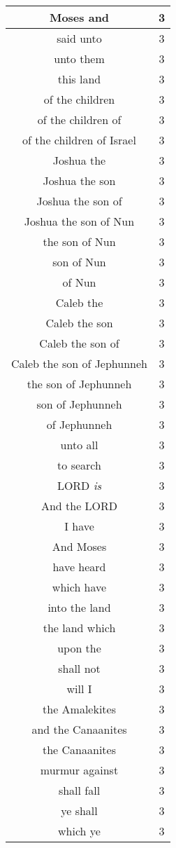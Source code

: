 \begin{center}
\begin{longtable}{|c|c|}
Moses and & 3\\ \hline 
said unto & 3\\ \hline 
unto them & 3\\ \hline 
this land & 3\\ \hline 
of the children & 3\\ \hline 
of the children of & 3\\ \hline 
of the children of Israel & 3\\ \hline 
Joshua the & 3\\ \hline 
Joshua the son & 3\\ \hline 
Joshua the son of & 3\\ \hline 
Joshua the son of Nun & 3\\ \hline 
the son of Nun & 3\\ \hline 
son of Nun & 3\\ \hline 
of Nun & 3\\ \hline 
Caleb the & 3\\ \hline 
Caleb the son & 3\\ \hline 
Caleb the son of & 3\\ \hline 
Caleb the son of Jephunneh & 3\\ \hline 
the son of Jephunneh & 3\\ \hline 
son of Jephunneh & 3\\ \hline 
of Jephunneh & 3\\ \hline 
unto all & 3\\ \hline 
to search & 3\\ \hline 
LORD \emph{is} & 3\\ \hline 
And the LORD & 3\\ \hline 
I have & 3\\ \hline 
And Moses & 3\\ \hline 
have heard & 3\\ \hline 
which have & 3\\ \hline 
into the land & 3\\ \hline 
the land which & 3\\ \hline 
upon the & 3\\ \hline 
shall not & 3\\ \hline 
will I & 3\\ \hline 
the Amalekites & 3\\ \hline 
and the Canaanites & 3\\ \hline 
the Canaanites & 3\\ \hline 
murmur against & 3\\ \hline 
shall fall & 3\\ \hline 
ye shall & 3\\ \hline 
which ye & 3\\ \hline 
\end{longtable}
\end{center}





